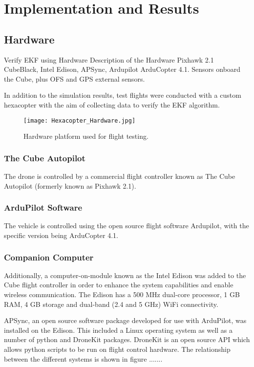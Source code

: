 
\chapter{Implementation and Results}


\section{Hardware}\label{section:Hardware}
Verify EKF using Hardware
Description of the Hardware
Pixhawk 2.1 CubeBlack, Intel Edison, APSync, Ardupilot ArduCopter 4.1. 
Sensors onboard the Cube, plus OFS and GPS external sensors.

In addition to the simulation results, test flights were conducted with a custom hexacopter with the aim of collecting data to verify the EKF algorithm.

\begin{figure}[htb]
	\texttt{[image: Hexacopter\_Hardware.jpg]}%
	\caption{Hardware platform used for flight testing.}%
	\label{fig:hardware}%
\end{figure}

\subsection{The Cube Autopilot}
The drone is controlled by a commercial flight controller known as The Cube Autopilot (formerly known as Pixhawk 2.1).
\subsection{ArduPilot Software}
The vehicle is controlled using the open source flight software Ardupilot, with the specific version being ArduCopter 4.1.
\subsection{Companion Computer}
Additionally, a computer-on-module known as the Intel Edison was added to the Cube flight controller in order to enhance the system capabilities and enable wireless communication. The Edison has a 500 MHz dual-core processor, 1 GB RAM, 4 GB storage and dual-band (2.4 and 5 GHz) WiFi connectivity.

APSync, an open source software package developed for use with ArduPilot, was installed on the Edison. This included a Linux operating system as well as a number of python and DroneKit packages. DroneKit is an open source API which allows python scripts to be run on flight control hardware. The relationship between the different systems is shown in figure .......

